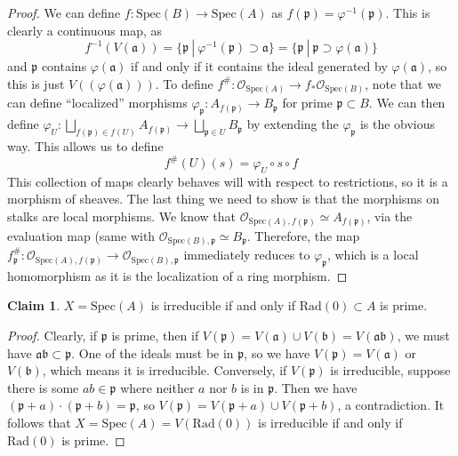 \documentclass[aps,pra,showpacs,notitlepage,onecolumn,superscriptaddress,nofootinbib]{revtex4-1}
\theoremstyle{definition}
\newtheorem{claim}{Claim}[section]
\begin{document}
\begin{proof}
  We can define $f : \text{Spec}(B) \rightarrow \text{Spec}(A)$ as $f(\mathfrak{p}) = \varphi^{-1}(\mathfrak{p})$. This is clearly a continuous map, as
  \begin{equation}
    f^{-1}(V(\mathfrak{a})) = \{ \mathfrak{p} \ | \ \varphi^{-1}(\mathfrak{p}) \supset \mathfrak{a}\} = \{ \mathfrak{p} \ | \ \mathfrak{p} \supset \varphi(\mathfrak{a})\}
    \end{equation}
  and $\mathfrak{p}$ contains $\varphi(\mathfrak{a})$ if and only if it contains the ideal generated by $\varphi(\mathfrak{a})$, so this is just $V((\varphi(\mathfrak{a})))$.
  To define $f^{\#} : \mathcal{O}_{\text{Spec}(A)} \rightarrow f_{*} \mathcal{O}_{\text{Spec}(B)}$, note that
  we can define ``localized'' morphisms $\varphi_{\mathfrak{p}} : A_{f(\mathfrak{p})} \rightarrow B_{\mathfrak{p}}$ for prime $\mathfrak{p} \subset B$. We can then define
  $\varphi_U : \bigsqcup_{f(\mathfrak{p}) \in f(U)} A_{f(\mathfrak{p})} \rightarrow \bigsqcup_{\mathfrak{p} \in U} B_{\mathfrak{p}}$ by extending the $\varphi_{\mathfrak{p}}$
  is the obvious way. This allows us to define
  \begin{equation}
    f^{\#}(U)(s) = \varphi_U \circ s \circ f
    \end{equation}
  This collection of maps clearly behaves will with respect to restrictions, so it is a morphism of sheaves. The last thing we need to show is that the morphisms on stalks
  are local morphisms. We know that $\mathcal{O}_{\text{Spec}(A), f(\mathfrak{p})} \simeq A_{f(\mathfrak{p})}$, via the evaluation map (same with $\mathcal{O}_{\text{Spec}(B), \mathfrak{p}} \simeq B_{\mathfrak{p}}$.
  Therefore, the map $f^{\#}_{\mathfrak{p}} : \mathcal{O}_{\text{Spec}(A), f(\mathfrak{p})} \rightarrow \mathcal{O}_{\text{Spec}(B), \mathfrak{p}}$ immediately reduces to $\varphi_{\mathfrak{p}}$, which is a local
  homomorphism as it is the localization of a ring morphism.
  \end{proof}

\begin{claim}
  $X = \text{Spec}(A)$ is irreducible if and only if $\text{Rad}(0) \subset A$ is prime.
  \end{claim}
\begin{proof}
  Clearly, if $\mathfrak{p}$ is prime, then if
  $V(\mathfrak{p}) = V(\mathfrak{a}) \cup V(\mathfrak{b}) = V(\mathfrak{a} \mathfrak{b})$, we must have
  $\mathfrak{a} \mathfrak{b} \subset \mathfrak{p}$. One of the ideals must be in $\mathfrak{p}$, so we have
  $V(\mathfrak{p}) = V(\mathfrak{a})$ or $V(\mathfrak{b})$, which means it is irreducible. Conversely, if $V(\mathfrak{p})$
  is irreducible, suppose there is some $ab \in \mathfrak{p}$ where neither $a$ nor $b$ is in $\mathfrak{p}$. Then we have
  $(\mathfrak{p} + a) \cdot (\mathfrak{p} + b) = \mathfrak{p}$, so $V(\mathfrak{p}) = V(\mathfrak{p} + a) \cup V(\mathfrak{p} + b)$, a contradiction. It follows that $X = \text{Spec}(A) = V(\text{Rad}(0))$ is irreducible if and only if $\text{Rad}(0)$
  is prime.
  \end{proof}
\end{document}

